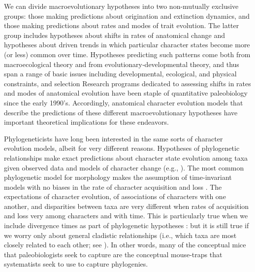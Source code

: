 \documentclass{article}
\begin{document}
We can divide macroevolutionary hypotheses into two non-mutually exclusive groups: those making predictions about origination and extinction dynamics, and those making predictions about rates and modes of trait evolution. 
The latter group includes hypotheses about shifts in rates of anatomical change and hypotheses about driven trends in which particular character states become more (or less) common over time.  
Hypotheses predicting such patterns come both from macroecological theory and from evolutionary‑developmental theory, and thus span a range of basic issues including developmental, ecological, and physical constraints, and selection  \citep{valentine1969patterns, valentine1980determinants}
Research programs dedicated to assessing shifts in rates and modes of anatomical evolution have been staple of quantitative paleobiology since the early 1990’s. 
Accordingly, anatomical character evolution models that describe the predictions of these different macroevolutionary hypotheses have important theoretical implications for these endeavors. 

Phylogeneticists have long been interested in the same sorts of character evolution models, albeit for very different reasons.  
Hypotheses of phylogenetic relationships make exact predictions about character state evolution among taxa given observed data and models of character change (e.g., \cite{Kimura1980, Felsenstein1981, Hasegawa1985, Tavare1986}).  
The most common phylogenetic model for morphology makes the assumption of time-invariant models with no biases in the rate of character acquisition and loss \citep{Lewis2001}.
The expectations of character evolution, of associations of characters with one another, and disparities between taxa are very different when rates of acquisition and loss very among characters and with time.
This is particularly true when we include divergence times as part of phylogenetic hypotheses \citep{Huelsenbeck2000a, Sanderson2002, Drummond2006}: but it is still true if we worry only about general cladistic relationships (i.e., which taxa are most closely related to each other; see \cite{Felsenstein1981, Nylander2004, Wright2016}).  
In other words, many of the conceptual mice that paleobiologists seek to capture are the conceptual mouse-traps that systematists seek to use to capture phylogenies.  
\end{document}
